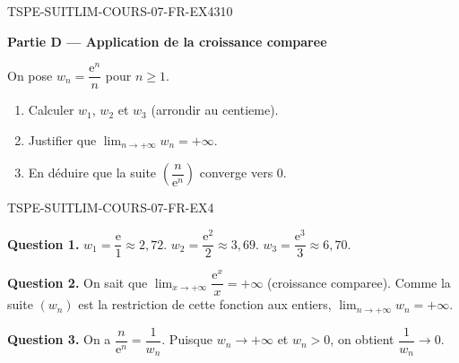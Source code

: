 \bigskip


\begin{exercice}{TSPE-SUITLIM-COURS-07-FR-EX4}{3}{10}

\textbf{Partie D — Application de la croissance comparee}

On pose $w_n = \dfrac{\mathrm{e}^n}{n}$ pour $n \geq 1$.

\begin{enumerate}
  \item Calculer $w_1$, $w_2$ et $w_3$ (arrondir au centieme).
  \item Justifier que $\lim_{n \to +\infty} w_n = +\infty$.
  \item En déduire que la suite $\left(\dfrac{n}{\mathrm{e}^n}\right)$ converge vers $0$.
\end{enumerate}

\end{exercice}

\begin{corrige}{TSPE-SUITLIM-COURS-07-FR-EX4}

\textbf{Question 1.} $w_1 = \dfrac{\mathrm{e}}{1} \approx 2{,}72$. $w_2 = \dfrac{\mathrm{e}^2}{2} \approx 3{,}69$. $w_3 = \dfrac{\mathrm{e}^3}{3} \approx 6{,}70$.

\textbf{Question 2.} On sait que $\lim_{x \to +\infty} \dfrac{\mathrm{e}^x}{x} = +\infty$ (croissance comparee). Comme la suite $(w_n)$ est la restriction de cette fonction aux entiers, $\lim_{n \to +\infty} w_n = +\infty$.

\textbf{Question 3.} On a $\dfrac{n}{\mathrm{e}^n} = \dfrac{1}{w_n}$. Puisque $w_n \to +\infty$ et $w_n > 0$, on obtient $\dfrac{1}{w_n} \to 0$.

\end{corrige}
